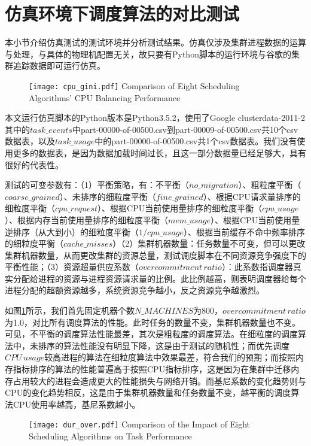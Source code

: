 \section{仿真环境下调度算法的对比测试}

本小节介绍仿真测试的测试环境并分析测试结果。仿真仅涉及集群进程数据的运算与处理，与具体的物理机配置无关，故只要有Python脚本的运行环境与谷歌的集群追踪数据即可运行仿真。

\begin{figure}[!htp]
  \centering
  \texttt{[image: cpu\_gini.pdf]}
    {Comparison of Eight Scheduling Algorithms' CPU Balancing Performance}
  \label{fig:cpu_gini}
\end{figure}
本文运行仿真脚本的Python版本是Python3.5.2，使用了Google clusterdata-2011-2其中的$task\_events$中part-00000-of-00500.csv到part-00009-of-00500.csv共10个csv数据表，以及$task\_usage$中的part-00000-of-00500.csv共1个csv数据表。我们没有使用更多的数据表，是因为数据加载时间过长，且这一部分数据量已经足够大，具有很好的代表性。

测试的可变参数有：（1）平衡策略，有：不平衡（$no\_migration$）、粗粒度平衡（$coarse\_grained$）、未排序的细粒度平衡（$fine\_grained$）、根据CPU请求量排序的细粒度平衡（$cpu\_request$）、根据CPU当前使用量排序的细粒度平衡（$cpu\_usage$）、根据内存当前使用量排序的细粒度平衡（$mem\_usage$）、根据CPU当前使用量逆排序（从大到小）的细粒度平衡（$1/cpu\_usage$）、根据当前缓存不命中频率排序的细粒度平衡（$cache\_misses$）（2）集群机器数量：任务数量不可变，但可以更改集群机器数量，从而更改集群的资源总量，测试调度脚本在不同资源竞争强度下的平衡性能；（3）资源超量供应系数（$overcommitment\,ratio$）：此系数指调度器真实分配给进程的资源与进程资源请求量的比例。此比例越高，则表明调度器给每个进程分配的超额资源越多，系统资源竞争越小，反之资源竞争越激烈。

如图\ref{fig:cpu_gini}所示，我们首先固定机器个数$N\_MACHINES$为800，$overcommitment\,ratio$为1.0，对比所有调度算法的性能。此时任务的数量不变，集群机器数量也不变。可见，不平衡的调度算法性能最差，其次是粗粒度的调度算法。在细粒度的调度算法中，未排序的算法性能没有明显下降，这是由于测试的随机性；而优先调度$CPU\,usage$较高进程的算法在细粒度算法中效果最差，符合我们的预期；而按照内存指标排序的算法的性能普遍高于按照CPU指标排序，这是因为在集群中迁移内存占用较大的进程会造成更大的性能损失与网络开销。而基尼系数的变化趋势则与CPU的变化趋势相反，这是由于集群机器数量和任务数量不变，越平衡的调度算法CPU使用率越高，基尼系数越小。

\begin{figure}[!htp]
  \centering
  \texttt{[image: dur\_over.pdf]}
    {Comparison of the Impact of Eight Scheduling Algorithms on Task Performance}
  \label{fig:dur_over}
\end{figure}

